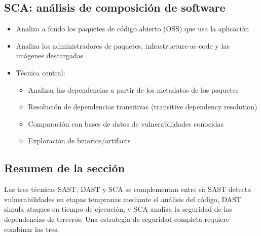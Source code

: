\subsection{SCA: análisis de composición de software}

\begin{itemize}
    \item Analiza a fondo los paquetes de código abierto (OSS) que usa la aplicación
    \item Analiza los administradores de paquetes, infrastructure-as-code y las imágenes descargadas
    \item Técnica central:
    \begin{itemize}
        \item Analizar las dependencias a partir de los metadatos de los paquetes
        \item Resolución de dependencias transitivas (transitive dependency resolution)
        \item Comparación con bases de datos de vulnerabilidades conocidas
        \item Exploración de binarios/artifacts
    \end{itemize}
\end{itemize}

\subsection{Resumen de la sección}

Las tres técnicas SAST, DAST y SCA se complementan entre sí: SAST detecta vulnerabilidades en etapas tempranas mediante el análisis del código, DAST simula ataques en tiempo de ejecución, y SCA analiza la seguridad de las dependencias de terceros. Una estrategia de seguridad completa requiere combinar las tres.
